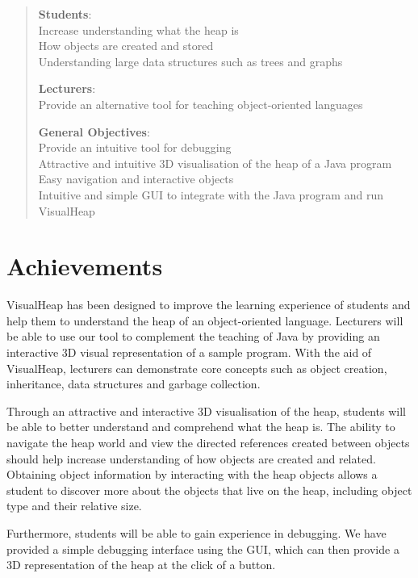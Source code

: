 \documentclass[11pt, a4paper]{report}
\begin{document}
\begin{quote}

{\bfseries Students}: \\
Increase understanding what the heap is \\
How objects are created and stored \\
Understanding large data structures such as trees and graphs

{\bfseries Lecturers}: \\
Provide an alternative tool for teaching object-oriented languages

{\bfseries General Objectives}: \\
Provide an intuitive tool for debugging \\
Attractive and intuitive 3D visualisation of the heap of a Java program \\
Easy navigation and interactive objects \\
Intuitive and simple GUI to integrate with the Java program and run VisualHeap

\end{quote}

\section{Achievements}

VisualHeap has been designed to improve the learning experience of students and help them to understand the heap of an object-oriented language. Lecturers will be able to use our tool to complement the teaching of Java by providing an interactive 3D visual representation of a sample program. With the aid of VisualHeap, lecturers can demonstrate core concepts such as object creation, inheritance, data structures and garbage collection. 

Through an attractive and interactive 3D visualisation of the heap, students will be able to better understand and comprehend what the heap is. The ability to navigate the heap world and view the directed references created between objects should help increase understanding of how objects are created and related. Obtaining object information by interacting with the heap objects allows a student to discover more about the objects that live on the heap, including object type and their relative size.

Furthermore, students will be able to gain experience in debugging. We have provided a simple debugging interface using the GUI, which can then provide a 3D representation of the heap at the click of a button. 
\end{document}
